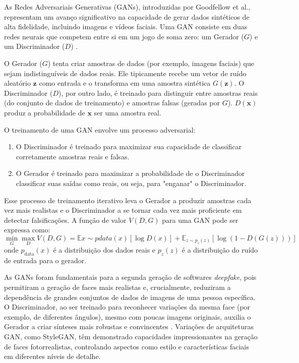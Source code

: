 As Redes Adversariais Generativas (GANs), introduzidas por Goodfellow et al., representam um avanço significativo na capacidade de gerar dados sintéticos de alta fidelidade, incluindo imagens e vídeos faciais. Uma GAN consiste em duas redes neurais que competem entre si em um jogo de soma zero: um Gerador ($G$) e um Discriminador ($D$) \cite{langguth2021dont}.

O Gerador ($G$) tenta criar amostras de dados (por exemplo, imagens faciais) que sejam indistinguíveis de dados reais. Ele tipicamente recebe um vetor de ruído aleatório $\mathbf{z}$ como entrada e o transforma em uma amostra sintética $G(\mathbf{z})$. O Discriminador ($D$), por outro lado, é treinado para distinguir entre amostras reais (do conjunto de dados de treinamento) e amostras falsas (geradas por $G$). $D(\mathbf{x})$ produz a probabilidade de $\mathbf{x}$ ser uma amostra real.

O treinamento de uma GAN envolve um processo adversarial:

\begin{enumerate}
  \item O Discriminador é treinado para maximizar sua capacidade de classificar corretamente amostras reais e falsas.
  \item O Gerador é treinado para maximizar a probabilidade de o Discriminador classificar suas saídas como reais, ou seja, para "enganar" o Discriminador.
\end{enumerate}
Esse processo de treinamento iterativo leva o Gerador a produzir amostras cada vez mais realistas e o Discriminador a se tornar cada vez mais proficiente em detectar falsificações. A função de valor $V(D,G)$ para uma GAN pode ser expressa como:
\begin{equation}
\min_G \max_D V(D,G) = \mathbb{E}{x \sim p{data}(x)}[\log D(x)] + \mathbb{E}_{z \sim p_z(z)}[\log(1 - D(G(z)))]
\label{eq:gan_loss_v2}
\end{equation}
onde $p_{\text{data}}(x)$ é a distribuição dos dados reais e $p_z(z)$ é a distribuição do ruído de entrada para o gerador.

As GANs foram fundamentais para a segunda geração de softwares \textit{deepfake}, pois permitiram a geração de faces mais realistas e, crucialmente, reduziram a dependência de grandes conjuntos de dados de imagens de uma pessoa específica. O Discriminador, ao ser treinado para reconhecer variações da mesma face (por exemplo, de diferentes ângulos), mesmo com poucas imagens originais, auxilia o Gerador a criar sínteses mais robustas e convincentes \cite{langguth2021dont}. Variações de arquiteturas GAN, como StyleGAN, têm demonstrado capacidades impressionantes na geração de faces fotorrealistas, controlando aspectos como estilo e características faciais em diferentes níveis de detalhe.

